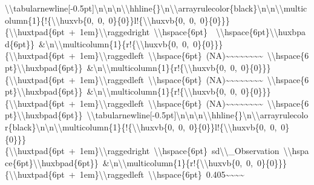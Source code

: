\documentclass[
  english,
  man]{apa6}
\begin{document}
\textbackslash{}\textbackslash{}tabularnewline{[}-0.5pt{]}\textbackslash{}n\textbackslash{}n\textbackslash{}n\textbackslash{}\textbackslash{}hhline\{\}\textbackslash{}n\textbackslash{}\textbackslash{}arrayrulecolor\{black\}\textbackslash{}n\textbackslash{}n\textbackslash{}\textbackslash{}multicolumn\{1\}\{!\{\textbackslash{}\textbackslash{}huxvb\{0,\ 0,\ 0\}\{0\}\}l!\{\textbackslash{}\textbackslash{}huxvb\{0,\ 0,\ 0\}\{0\}\}\}\{\textbackslash{}\textbackslash{}huxtpad\{6pt\ +\ 1em\}\textbackslash{}\textbackslash{}raggedright\ \textbackslash{}\textbackslash{}hspace\{6pt\}\ \ \textbackslash{}\textbackslash{}hspace\{6pt\}\textbackslash{}\textbackslash{}huxbpad\{6pt\}\}\ \&\textbackslash{}n\textbackslash{}\textbackslash{}multicolumn\{1\}\{r!\{\textbackslash{}\textbackslash{}huxvb\{0,\ 0,\ 0\}\{0\}\}\}\{\textbackslash{}\textbackslash{}huxtpad\{6pt\ +\ 1em\}\textbackslash{}\textbackslash{}raggedleft\ \textbackslash{}\textbackslash{}hspace\{6pt\}\ (NA)\textasciitilde{}\textasciitilde{}\textasciitilde{}\textasciitilde{}\textasciitilde{}\textasciitilde{}\textasciitilde{}\textasciitilde{}\ \textbackslash{}\textbackslash{}hspace\{6pt\}\textbackslash{}\textbackslash{}huxbpad\{6pt\}\}\ \&\textbackslash{}n\textbackslash{}\textbackslash{}multicolumn\{1\}\{r!\{\textbackslash{}\textbackslash{}huxvb\{0,\ 0,\ 0\}\{0\}\}\}\{\textbackslash{}\textbackslash{}huxtpad\{6pt\ +\ 1em\}\textbackslash{}\textbackslash{}raggedleft\ \textbackslash{}\textbackslash{}hspace\{6pt\}\ (NA)\textasciitilde{}\textasciitilde{}\textasciitilde{}\textasciitilde{}\textasciitilde{}\textasciitilde{}\textasciitilde{}\textasciitilde{}\ \textbackslash{}\textbackslash{}hspace\{6pt\}\textbackslash{}\textbackslash{}huxbpad\{6pt\}\}\ \&\textbackslash{}n\textbackslash{}\textbackslash{}multicolumn\{1\}\{r!\{\textbackslash{}\textbackslash{}huxvb\{0,\ 0,\ 0\}\{0\}\}\}\{\textbackslash{}\textbackslash{}huxtpad\{6pt\ +\ 1em\}\textbackslash{}\textbackslash{}raggedleft\ \textbackslash{}\textbackslash{}hspace\{6pt\}\ (NA)\textasciitilde{}\textasciitilde{}\textasciitilde{}\textasciitilde{}\textasciitilde{}\textasciitilde{}\textasciitilde{}\textasciitilde{}\ \textbackslash{}\textbackslash{}hspace\{6pt\}\textbackslash{}\textbackslash{}huxbpad\{6pt\}\}\ \textbackslash{}\textbackslash{}tabularnewline{[}-0.5pt{]}\textbackslash{}n\textbackslash{}n\textbackslash{}n\textbackslash{}\textbackslash{}hhline\{\}\textbackslash{}n\textbackslash{}\textbackslash{}arrayrulecolor\{black\}\textbackslash{}n\textbackslash{}n\textbackslash{}\textbackslash{}multicolumn\{1\}\{!\{\textbackslash{}\textbackslash{}huxvb\{0,\ 0,\ 0\}\{0\}\}l!\{\textbackslash{}\textbackslash{}huxvb\{0,\ 0,\ 0\}\{0\}\}\}\{\textbackslash{}\textbackslash{}huxtpad\{6pt\ +\ 1em\}\textbackslash{}\textbackslash{}raggedright\ \textbackslash{}\textbackslash{}hspace\{6pt\}\ sd\textbackslash{}\textbackslash{}\_Observation\ \textbackslash{}\textbackslash{}hspace\{6pt\}\textbackslash{}\textbackslash{}huxbpad\{6pt\}\}\ \&\textbackslash{}n\textbackslash{}\textbackslash{}multicolumn\{1\}\{r!\{\textbackslash{}\textbackslash{}huxvb\{0,\ 0,\ 0\}\{0\}\}\}\{\textbackslash{}\textbackslash{}huxtpad\{6pt\ +\ 1em\}\textbackslash{}\textbackslash{}raggedleft\ \textbackslash{}\textbackslash{}hspace\{6pt\}\ 0.405\textasciitilde{}\textasciitilde{}\textasciitilde{}\textasciitilde{}\ 
\end{document}
